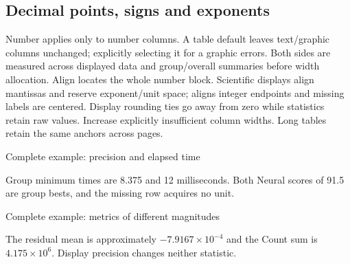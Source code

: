 \subsection{Decimal points, signs and exponents}
Number  applies only to number columns. A table default leaves
text/graphic columns unchanged; explicitly selecting it for a graphic errors.
Both sides are measured across displayed data and group/overall summaries before
width allocation. Align locates the whole number block. Scientific displays
align mantissas and reserve exponent/unit space;  aligns integer
endpoints and missing labels are centered. Display rounding ties go away from
zero while statistics retain raw values. Increase explicitly insufficient
column widths. Long tables retain the same anchors across pages.
\begin{demo}{Complete example: precision and elapsed time}
\begin{gradtable}[data=precision,width=\linewidth,style=research,theme=teal,
  formatter=siunitx,group by=family,rank scope=group,group summary=true,
  sort keys={score/descending,time/ascending},header align=c]
\end{gradtable}
\end{demo}
Group minimum times are 8.375 and 12 milliseconds. Both Neural scores of 91.5
are group bests, and the missing row acquires no unit.
\begin{demo}{Complete example: metrics of different magnitudes}
\begin{gradtable}[data=magnitudes,width=\linewidth,style=research,theme=violet,header align=c]
\end{gradtable}
\end{demo}
The residual mean is approximately $-7.9167\times10^{-4}$ and the Count sum is
$4.175\times10^6$. Display precision changes neither statistic.
